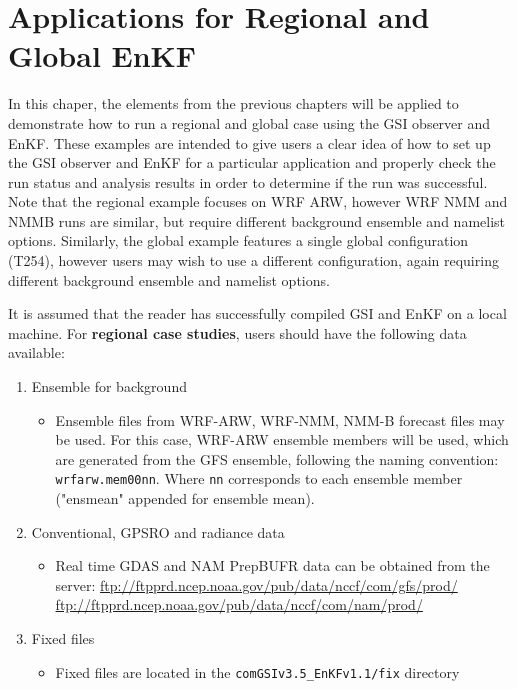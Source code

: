 \chapter{Applications for Regional and Global EnKF}\label{application}
\setlength{\parskip}{12pt}

In this chaper, the elements from the previous chapters will be applied to demonstrate how to run a regional and global case using the GSI observer and EnKF. These examples are intended to give users a clear idea of how to set up the GSI observer and EnKF for a particular application and properly check the run status and analysis results in order to determine if the run was successful. Note that the regional example focuses on WRF ARW, however WRF NMM and NMMB runs are similar, but require different background ensemble and namelist options. Similarly, the global example features a single global configuration (T254), however users may wish to use a different configuration, again requiring different background ensemble and namelist options.

It is assumed that the reader has successfully compiled GSI and EnKF on a local machine. 
For \textbf{regional case studies}, users should have the following data available:
\begin{enumerate}
\item Ensemble for background
\begin{itemize}
\item Ensemble files from WRF-ARW, WRF-NMM, NMM-B forecast files may be
used. For this case, WRF-ARW ensemble members will be used, which are generated from the GFS ensemble, following the naming convention: \verb|wrfarw.mem00nn|. Where \verb|nn| corresponds to each ensemble member ("ensmean" appended for ensemble mean).
\end{itemize}
\item Conventional, GPSRO and radiance data
\begin{itemize}
\item Real time GDAS and NAM PrepBUFR data can be obtained from the server:
\url{ftp://ftpprd.ncep.noaa.gov/pub/data/nccf/com/gfs/prod/}   \\
\url{ftp://ftpprd.ncep.noaa.gov/pub/data/nccf/com/nam/prod/}  \\
\end{itemize}
\item Fixed files
\begin{itemize}
\item Fixed files are located in the \verb|comGSIv3.5_EnKFv1.1/fix| directory
\end{itemize}
\end{enumerate}


